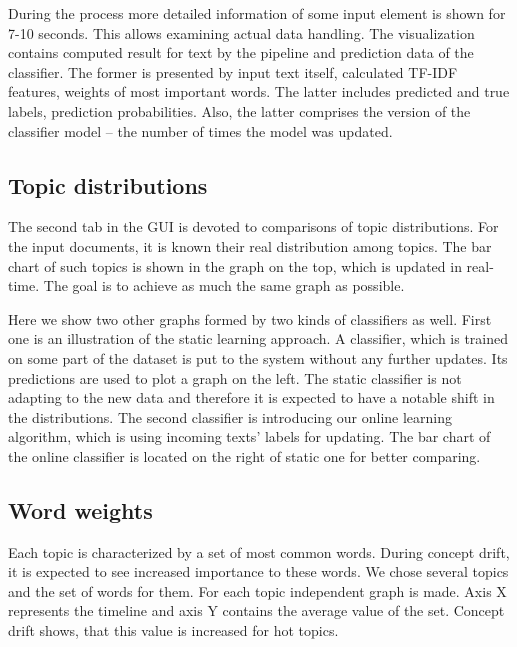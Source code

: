 During the process more detailed information of some input element is shown for 7-10 seconds. This allows examining actual data handling. The visualization contains computed result for text by the pipeline and prediction data of the classifier. The former is presented by input text itself, calculated TF-IDF features, weights of most important words. The latter includes predicted and true labels, prediction probabilities. Also, the latter comprises the version of the classifier model -- the number of times the model was updated.

\subsection{Topic distributions}

The second tab in the GUI is devoted to comparisons of topic distributions. For the input documents, it is known their real distribution among topics. The bar chart of such topics is shown in the graph on the top, which is updated in real-time. The goal is to achieve as much the same graph as possible. 

Here we show two other graphs formed by two kinds of classifiers as well. First one is an illustration of the static learning approach. A classifier, which is trained on some part of the dataset is put to the system without any further updates. Its predictions are used to plot a graph on the left. The static classifier is not adapting to the new data and therefore it is expected to have a notable shift in the distributions. The second classifier is introducing our online learning algorithm, which is using incoming texts' labels for updating. The bar chart of the online classifier is located on the right of static one for better comparing.

\subsection{Word weights}

Each topic is characterized by a set of most common words. During concept drift, it is expected to see increased importance to these words. We chose several topics and the set of words for them. For each topic independent graph is made. Axis X represents the timeline and axis Y contains the average value of the set. Concept drift shows, that this value is increased for hot topics.

